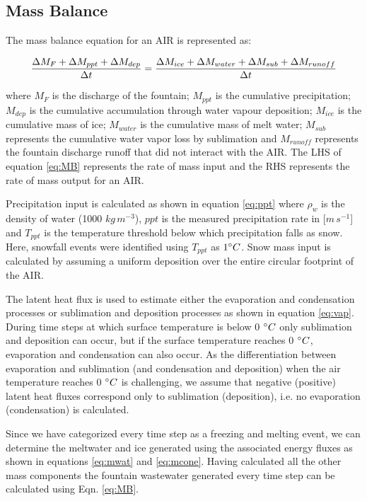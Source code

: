\documentclass[utf8]{frontiersSCNS} %
\begin{document}
\subsection{Mass Balance}

The mass balance equation for an AIR is represented as:

\begin{equation}
	\frac{\Delta M_{F} + \Delta M_{ppt} + \Delta M_{dep}}{\Delta t} = \frac{\Delta M_{ice} +\Delta M_{water} +
		\Delta M_{sub} + \Delta M_{runoff}}{\Delta t}  \\
	\label{eq:MB}
\end{equation}

where $M_{F}$ is the discharge of the fountain; $M_{ppt}$ is the cumulative precipitation;  $M_{dep}$ is the cumulative
accumulation through water vapour deposition; $M_{ice}$ is the cumulative mass of ice; $M_{water}$ is the cumulative
mass of melt water; $M_{sub}$ represents the cumulative water vapor loss by sublimation and $M_{runoff}$ represents the
fountain discharge runoff that did not interact with the AIR. The LHS of equation \ref{eq:MB} represents the rate of
mass input and the RHS represents the rate of mass output for an AIR.

Precipitation input is calculated as shown in equation \ref{eq:ppt} where $\rho_{w}$ is the density of water (1000
$kg\,m^{-3}$), $ppt$ is the measured precipitation rate in [$m\,s^{-1}$] and $T_{ppt}$ is the temperature threshold
below which precipitation falls as snow. Here, snowfall events were identified using $T_{ppt}$ as $1 \degree C$. Snow
mass input is calculated by assuming a uniform deposition over the entire circular footprint of the AIR.

The latent heat flux is used to estimate either the evaporation and condensation processes or sublimation and deposition
processes as shown in equation \ref{eq:vap}. During time steps at which surface temperature is below 0 $\degree C$ only
sublimation and deposition can occur, but if the surface temperature reaches 0 $\degree C$, evaporation and condensation
can also occur. As the differentiation between evaporation and sublimation (and condensation and deposition) when the
air temperature reaches 0 $\degree C$ is challenging, we assume that negative (positive) latent heat fluxes correspond
only to sublimation (deposition), i.e. no evaporation (condensation) is calculated.

Since we have categorized every time step as a freezing and melting event, we can determine the meltwater and  ice
generated using the associated energy fluxes as shown in equations \ref{eq:mwat} and \ref{eq:mcone}. Having calculated
all the other mass components the fountain wastewater generated every time step can be calculated using Eqn.
\ref{eq:MB}.
\end{document}
